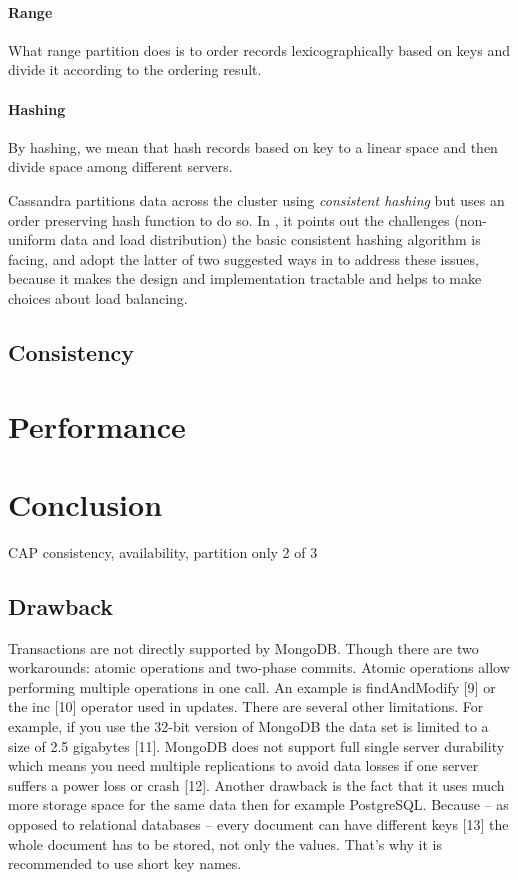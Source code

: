 \documentclass[12pt,letter]{article}
\begin{document}
\paragraph*{Range}
What range partition does is to order records lexicographically based on keys and divide it according to the ordering result.

\paragraph*{Hashing}
By hashing, we mean that hash records based on key to a linear space and then divide space among different servers.

Cassandra partitions data across the cluster using \textit{consistent hashing} but uses an order preserving hash function to do so. In \citep{LakshamAvinash2010}, it points out the challenges (non-uniform data and load distribution) the basic consistent hashing algorithm\citep{Karger1997} is facing, and adopt the latter of two suggested ways in \citep{Stoica2003} to address these issues, because it makes the design and implementation tractable and helps to make choices about load balancing.



\subsection{Consistency}

\section{Performance}

\section{Conclusion}
CAP consistency, availability, partition
only 2 of 3

\subsection{Drawback}
Transactions are not directly supported by MongoDB. Though there are two workarounds: atomic operations and two-phase commits. Atomic operations allow performing multiple operations in one call. An example is findAndModify [9] or the inc [10] operator used in updates.
There are several other limitations. For example, if you use the 32-bit version of MongoDB the data set is limited to a size of 2.5 gigabytes [11]. MongoDB does not support full single server durability which means you need multiple replications to avoid data losses if one server suffers a power loss or crash [12]. Another drawback is the fact that it uses much more storage space for the same data then for example PostgreSQL. Because – as opposed to relational databases – every document can have different keys [13] the whole document has to be stored, not only the values. That’s why it is recommended to use short key names.
\end{document}
